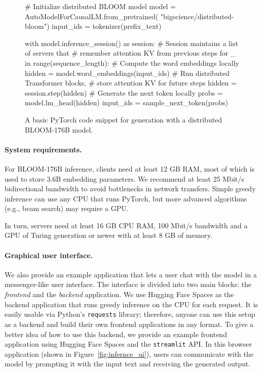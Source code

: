 
\begin{figure}[tb]
\small
\begin{pythoncode}
# Initialize distributed BLOOM model
model = AutoModelForCausalLM.from_pretrained(
    "bigscience/distributed-bloom")
input_ids = tokenizer(prefix_text)

with model.inference_session() as session:
    # Session maintains a list of servers that
    # remember attention KV from previous steps
    for _ in range(sequence_length):
        # Compute the word embeddings locally
        hidden = model.word_embeddings(input_ids)
        # Run distributed Transformer blocks,
        # store attention KV for future steps
        hidden = session.step(hidden)
        # Generate the next token locally
        probs = model.lm_head(hidden)
        input_ids = sample_next_token(probs)
\end{pythoncode}
    \vspace{-4mm}
    \caption{A basic PyTorch code snippet for generation with a distributed BLOOM-176B model.}
    \label{fig:infernce_snippet}
    \vspace{-5pt}
\end{figure}

\paragraph{System requirements.} For BLOOM-176B inference, clients need at least 12 GB RAM, most of which is used to store 3.6B embedding parameters. We recommend at least 25 Mbit/s bidirectional bandwidth to avoid bottlenecks in network transfers. Simple greedy inference can use any CPU that runs PyTorch, but more advanced algorithms (e.g., beam search) may require a GPU.

In turn, servers need at least 16 GB CPU RAM, 100 Mbit/s bandwidth and a GPU of Turing generation or newer with at least 8 GB of memory.

\paragraph{Graphical user interface.} We also provide an example application that lets a user chat with the model in a messenger-like user interface. The interface is divided into two main blocks: the \textit{frontend} and the \textit{backend} application.
We use Hugging Face Spaces as the backend application that runs greedy inference on the CPU for each request. It is easily usable via Python's \texttt{requests} library; therefore, anyone can use this setup as a backend and build their own frontend applications in any format.
To give a better idea of how to use this backend, we provide an example frontend application using Hugging Face Spaces and the \texttt{streamlit} API. In this browser application (shown in Figure~\ref{fig:infernce_ui}), users can communicate with the model by prompting it with the input text and receiving the generated output.

